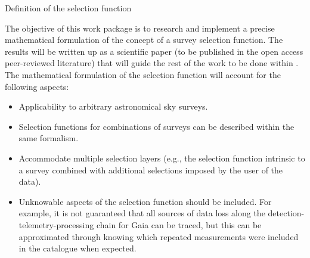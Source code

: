 \begin{workpackage}{Definition of the selection function}
  \label{wp:selfundefinition}
  
  \makewptable %

  \begin{wpobjectives}
    The objective of this work package is to research and implement a precise mathematical formulation of the concept of a survey selection function. The results will be written up as a scientific paper (to be published in the open access peer-reviewed literature) that will guide the rest of the work to be done within {\acro}.  The mathematical formulation of the selection function will account for the following aspects:
    \begin{itemize}
        \item Applicability to arbitrary astronomical sky surveys.
        \item Selection functions for combinations of surveys can be described within the same formalism.
        \item Accommodate multiple selection layers (e.g., the selection function intrinsic to a survey combined with additional selections imposed by the user of the data).
        \item Unknowable aspects of the selection function should be included. For example, it is not guaranteed that all sources of data loss along the detection-telemetry-processing chain for Gaia can be traced, but this can be approximated through knowing which repeated measurements were included in the catalogue when expected.
    \end{itemize}
  \end{wpobjectives}

  \begin{wpdescription}

\end{wpdescription}
\end{workpackage}
